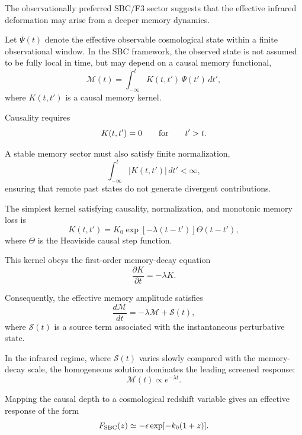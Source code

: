 The observationally preferred SBC/F3 sector suggests that the effective infrared deformation may arise from a deeper memory dynamics.

Let \(\Psi(t)\) denote the effective observable cosmological state within a finite observational window. In the SBC framework, the observed state is not assumed to be fully local in time, but may depend on a causal memory functional,
\begin{equation}
\mathcal{M}(t)
=
\int_{-\infty}^{t}
K(t,t')\,\Psi(t')\,dt',
\end{equation}
where \(K(t,t')\) is a causal memory kernel.

Causality requires
\begin{equation}
K(t,t')=0
\qquad
{\rm for}
\qquad
t'>t .
\end{equation}

A stable memory sector must also satisfy finite normalization,
\begin{equation}
\int_{-\infty}^{t}
|K(t,t')|\,dt'
<\infty ,
\end{equation}
ensuring that remote past states do not generate divergent contributions.

The simplest kernel satisfying causality, normalization, and monotonic memory loss is
\begin{equation}
K(t,t')
=
K_0
\exp[-\lambda(t-t')]
\Theta(t-t'),
\end{equation}
where \(\Theta\) is the Heaviside causal step function.

This kernel obeys the first-order memory-decay equation
\begin{equation}
\frac{\partial K}{\partial t}
=
-\lambda K .
\end{equation}

Consequently, the effective memory amplitude satisfies
\begin{equation}
\frac{d\mathcal{M}}{dt}
=
-\lambda \mathcal{M}
+
\mathcal{S}(t),
\end{equation}
where \(\mathcal{S}(t)\) is a source term associated with the instantaneous perturbative state.

In the infrared regime, where \(\mathcal{S}(t)\) varies slowly compared with the memory-decay scale, the homogeneous solution dominates the leading screened response:
\begin{equation}
\mathcal{M}(t)
\propto
e^{-\lambda t}.
\end{equation}

Mapping the causal depth to a cosmological redshift variable gives an effective response of the form
\begin{equation}
F_{\rm SBC}(z)
\simeq
-\epsilon
\exp[-k_0(1+z)].
\end{equation}

